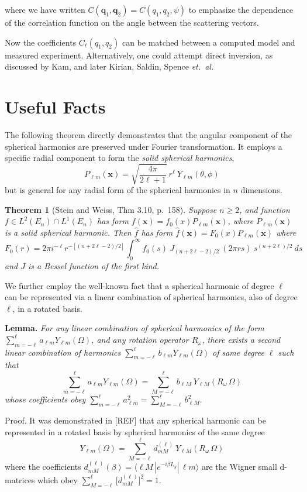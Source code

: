 \documentclass[aps,prl,preprint,groupedaddress]{revtex4-1}
\def\*#1{\mathbf{#1}}
\begin{document}
where we have written $C( \*q_1, \*q_2 ) = C( q_1, q_2, \psi )$ to emphasize the dependence of the correlation function on the angle between the scattering vectors.

Now the coefficients $C_\ell (q_1, q_2)$ can be matched between a computed model and measured experiment. Alternatively, one could attempt direct inversion, as discussed by Kam, and later Kirian, Saldin, Spence \textit{et.~al.}



 \section{Useful Facts}
 
The following theorem directly demonstrates that the angular component of the spherical harmonics are preserved under Fourier transformation. It employs a specific radial component to form the \textit{solid spherical harmonics},
\[
P_{\ell m}(\*x) = \sqrt{ \frac{4 \pi}{2 \ell +1} } \> r^\ell \> Y_{\ell m} (\theta, \phi)
\]
but is general for any radial form of the spherical harmonics in $n$ dimensions.
 
\textbf{Theorem 1} (Stein and Weiss, Thm 3.10, p.~158).
\textit{Suppose $n \geq 2$, and function $f \in L^2(E_n) \cap  L^1(E_n)$ has form $f(\*x) = f_0(x)P_{\ell m}(\*x)$, where $P_{\ell m}(\*x)$ is a solid spherical harmonic. Then $\hat{f}$ has form $\hat{f}(\*x) = F_0(x)P_{\ell m}(\*x)$ where
 \[
 F_0(r) = 2 \pi i^{-\ell} r^{-[(n+2\ell-2)/2]} \int_0^{\infty} f_0(s) \> J_{(n+2\ell-2) / 2} \> (2 \pi r s) \> s^{(n+2\ell)/2} \> ds
 \]
 and $J$ is a Bessel function of the first kind.}
 
We further employ the well-known fact that a spherical harmonic of degree $\ell$ can be represented via a linear combination of spherical harmonics, also of degree $\ell$, in a rotated basis.

\textbf{Lemma.}
\textit{For any linear combination of spherical harmonics of the form $\sum_{m=-\ell}^\ell a_{\ell m} Y_{\ell m} (\Omega)$, and any rotation operator $R_\omega$, there exists a second linear combination of harmonics $\sum_{m=-\ell}^\ell b_{\ell m} Y_{\ell m} (\Omega)$ of same degree $\ell$ such that
\[
\sum_{m=-\ell}^\ell a_{\ell m} Y_{\ell m} (\Omega) = \sum_{M=-\ell}^{\ell} b_{\ell M} \> Y_{\ell M} ( R_\omega \, \Omega )
\]
whose coefficients obey
$\sum_{m=-\ell}^\ell a_{\ell m}^2 = \sum_{M=-\ell}^\ell b_{\ell M}^2$}.

Proof. It was demonstrated in [REF] that any spherical harmonic can be represented in a rotated basis by spherical harmonics of the same degree 
\[
 Y_{\ell m} (\Omega) = \sum_{M=-\ell}^{\ell} d^{(\ell)}_{mM} \> Y_{\ell M} ( R_\omega \, \Omega )
\]
where the coefficients $d^{(\ell)}_{mM} (\beta) = \langle \ell M \, | e^{-i \beta L_y} | \, \ell m \rangle$ are the Wigner small d-matrices which obey $\sum_{M=-\ell}^{\ell} \big[ d^{(\ell)}_{mM} \big]^2 = 1$.
\end{document}
